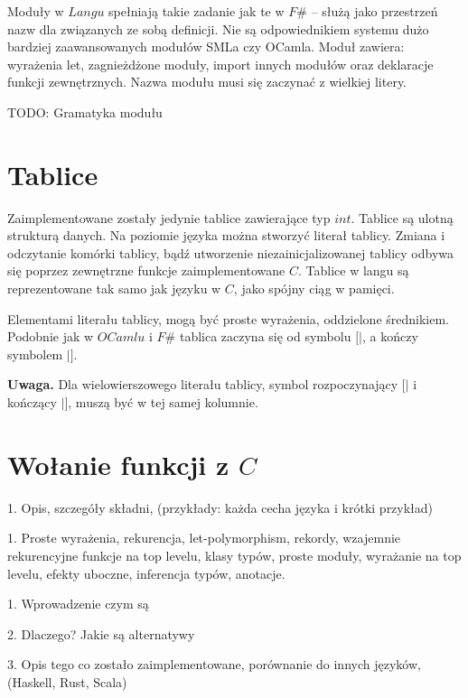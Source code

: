 \documentclass[declaration,shortabstract]{iithesis}
\begin{document}
Moduły w $Langu$ spełniają takie zadanie jak te w $F\#$ -- służą jako 
przestrzeń nazw dla związanych ze sobą definicji. Nie są odpowiednikiem 
systemu dużo bardziej zaawansowanych modułów SMLa czy OCamla.
Moduł zawiera: wyrażenia let, zagnieżdżone moduły, import innych 
modułów oraz deklaracje funkcji zewnętrznych. Nazwa modułu musi się zaczynać 
z wielkiej litery. 

TODO: Gramatyka modułu

\section{Tablice}

Zaimplementowane zostały jedynie tablice zawierające typ $int$. Tablice są 
ulotną strukturą danych. Na poziomie języka można stworzyć literał tablicy.
Zmiana i odczytanie komórki tablicy, bądź utworzenie niezainicjalizowanej tablicy odbywa się poprzez zewnętrzne funkcje zaimplementowane $C$. Tablice w 
langu są reprezentowane tak samo jak języku w $C$, jako spójny ciąg w pamięci.

Elementami literału tablicy, mogą być proste wyrażenia, oddzielone średnikiem. 
Podobnie jak w \newline $OCamlu$ i $F\#$ tablica zaczyna się od symbolu $[|$, a kończy symbolem $|]$.

\textbf{Uwaga.} Dla wielowierszowego literału tablicy, symbol rozpoczynający 
$[|$ i kończący $|]$, muszą być w tej samej kolumnie.

\section{Wołanie funkcji z $C$}

1. Opis, szczegóły składni, (przykłady: każda cecha języka i krótki przykład)

1. Proste wyrażenia, rekurencja, let-polymorphism, rekordy,
wzajemnie rekurencyjne funkcje na top levelu, klasy typów, proste moduły, 
wyrażanie na top levelu, efekty uboczne, inferencja typów, anotacje.


1. Wprowadzenie czym są 

2. Dlaczego? Jakie są alternatywy

3. Opis tego co zostało zaimplementowane, porównanie do innych języków, (Haskell,
Rust, Scala)
\end{document}
